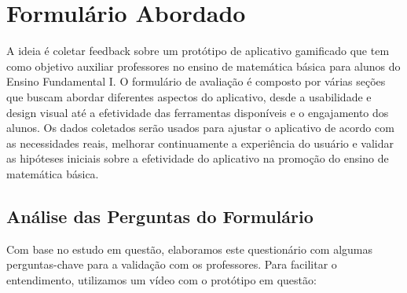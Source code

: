 \section{Formulário Abordado}

A ideia é coletar feedback sobre um protótipo de aplicativo gamificado que tem como objetivo auxiliar professores no ensino de matemática básica para alunos do Ensino Fundamental I. O formulário de avaliação é composto por várias seções que buscam abordar diferentes aspectos do aplicativo, desde a usabilidade e design visual até a efetividade das ferramentas disponíveis e o engajamento dos alunos. Os dados coletados serão usados para ajustar o aplicativo de acordo com as necessidades reais, melhorar continuamente a experiência do usuário e validar as hipóteses iniciais sobre a efetividade do aplicativo na promoção do ensino de matemática básica.

\subsection{Análise das Perguntas do Formulário}

Com base no estudo em questão, elaboramos este questionário com algumas perguntas-chave para a validação com os professores. Para facilitar o entendimento, utilizamos um vídeo com o protótipo em questão:

